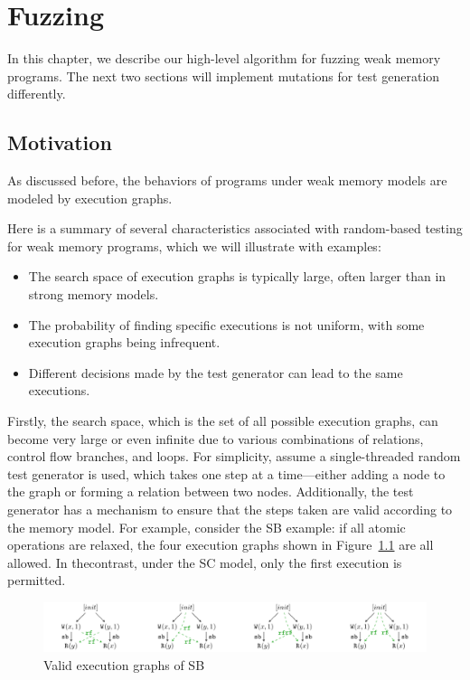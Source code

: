 \chapter{\label{cha:fuzz}Fuzzing}

In this chapter, we describe our high-level algorithm for fuzzing weak memory programs. The next two sections will implement mutations for test generation differently.

\section{Motivation}

As discussed before, the behaviors of programs under weak memory models are modeled by execution graphs. 


Here is a summary of several characteristics associated with random-based testing for weak memory programs, which we will illustrate with examples:
\begin{itemize}
    \item The search space of execution graphs is typically large, often larger than in strong memory models.
    \item The probability of finding specific executions is not uniform, with some execution graphs being infrequent.
    \item Different decisions made by the test generator can lead to the same executions.
\end{itemize}





Firstly, the search space, which is the set of all possible execution graphs, can become very large or even infinite due to various combinations of relations, control flow branches, and loops. For simplicity, assume a single-threaded random test generator is used, which takes one step at a time—either adding a node to the graph or forming a relation between two nodes. Additionally, the test generator has a mechanism to ensure that the steps taken are valid according to the memory model. For example, consider the SB example: if all atomic operations are relaxed, the four execution graphs shown in Figure~\ref{SB4} are all allowed. In thecontrast, under the SC model, only the first execution is permitted.


\begin{figure}[h!tbp] %
    \centering
    \includegraphics[scale=0.85]{figure/exec-graph/SB4.pdf} %
    \caption{Valid execution graphs of SB} %
    \label{SB4} %
\end{figure}




